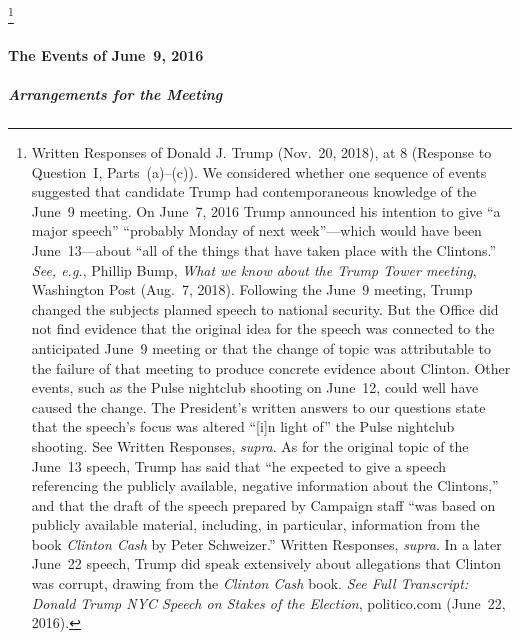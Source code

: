\footnote{Written Responses of Donald J. Trump (Nov.~20, 2018), at 8 (Response to Question~I, Parts~(a)--(c)).
We considered whether one sequence of events suggested that candidate Trump had contemporaneous knowledge of the June~9 meeting.
On June~7, 2016 Trump announced his intention to give “a major speech” “probably Monday of next week”---which would have been June~13---about “all of the things that have taken place with the Clintons.”
\textit{See, e.g.}, Phillip Bump, \textit{What we know about the Trump Tower meeting}, Washington Post (Aug.~7, 2018).
Following the June~9 meeting, Trump changed the subjects planned speech to national security.
But the Office did not find evidence that the original idea for the speech was connected to the anticipated June~9 meeting or that the change of topic was attributable to the failure of that meeting to produce concrete evidence about Clinton.
Other events, such as the Pulse nightclub shooting on June~12, could well have caused the change.
The President's written answers to our questions state that the speech's focus was altered “[i]n light of” the Pulse nightclub shooting.
See Written Responses, \textit{supra}.
As for the original topic of the June~13 speech, Trump has said that “he expected to give a speech referencing the publicly available, negative information about the Clintons,” and that the draft of the speech prepared by Campaign staff “was based on publicly available material, including, in particular, information from the book \textit{Clinton Cash} by Peter Schweizer.”
Written Responses, \textit{supra}.
In a later June~22 speech, Trump did speak extensively about allegations that Clinton was corrupt, drawing from the \textit{Clinton Cash} book.
\textit{See Full Transcript: Donald Trump NYC Speech on Stakes of the Election}, politico.com (June~22, 2016).}

\paragraph{The Events of June~9, 2016}

\subparagraph{Arrangements for the Meeting}

